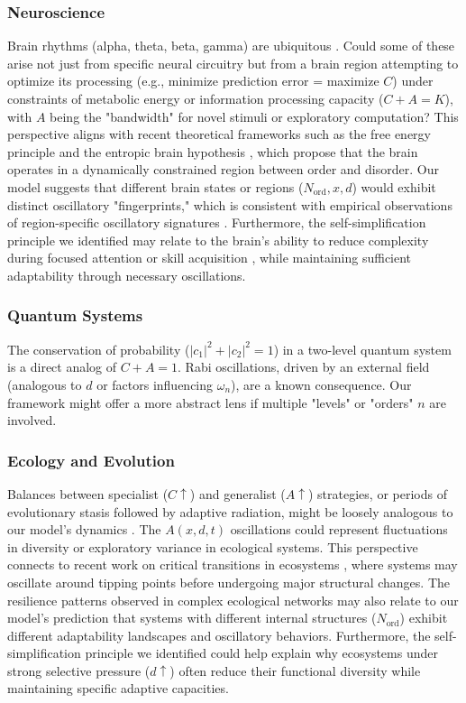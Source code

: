 \documentclass[11pt,a4paper]{article}
\begin{document}
\subsubsection{Neuroscience}
Brain rhythms (alpha, theta, beta, gamma) are ubiquitous \cite{Buzsaki2006}. Could some of these arise not just from specific neural circuitry but from a brain region attempting to optimize its processing (e.g., minimize prediction error = maximize $C$) under constraints of metabolic energy or information processing capacity ($C+A=K$), with $A$ being the "bandwidth" for novel stimuli or exploratory computation? This perspective aligns with recent theoretical frameworks such as the free energy principle \cite{Friston2010,Friston2019,Parr2020} and the entropic brain hypothesis \cite{Carhart-Harris2014,Carhart-Harris2018}, which propose that the brain operates in a dynamically constrained region between order and disorder. Our model suggests that different brain states or regions ($N_{\text{ord}}, x, d$) would exhibit distinct oscillatory "fingerprints," which is consistent with empirical observations of region-specific oscillatory signatures \cite{Buzsaki2006,Cocchi2017}. Furthermore, the self-simplification principle we identified may relate to the brain's ability to reduce complexity during focused attention or skill acquisition \cite{Marblestone2016}, while maintaining sufficient adaptability through necessary oscillations.

\subsubsection{Quantum Systems}
The conservation of probability ($|c_1|^2 + |c_2|^2 = 1$) in a two-level quantum system is a direct analog of $C+A=1$. Rabi oscillations, driven by an external field (analogous to $d$ or factors influencing $\omega_n$), are a known consequence. Our framework might offer a more abstract lens if multiple "levels" or "orders" $n$ are involved.

\subsubsection{Ecology and Evolution}
Balances between specialist ($C \uparrow$) and generalist ($A \uparrow$) strategies, or periods of evolutionary stasis followed by adaptive radiation, might be loosely analogous to our model's dynamics \cite{Whitacre2010}. The $A(x,d,t)$ oscillations could represent fluctuations in diversity or exploratory variance in ecological systems. This perspective connects to recent work on critical transitions in ecosystems \cite{Scheffer2009,Scheffer2012}, where systems may oscillate around tipping points before undergoing major structural changes. The resilience patterns observed in complex ecological networks \cite{Gao2016} may also relate to our model's prediction that systems with different internal structures ($N_{\text{ord}}$) exhibit different adaptability landscapes and oscillatory behaviors. Furthermore, the self-simplification principle we identified could help explain why ecosystems under strong selective pressure ($d \uparrow$) often reduce their functional diversity while maintaining specific adaptive capacities.
\end{document}
